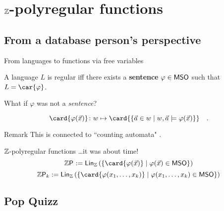 \documentclass{beamer}
\begin{document}
\section{$\mathbb{Z}$-polyregular functions}
\subsection{From a database person’s perspective}

\begin{frame}{From languages to functions via free variables}
    \begin{theorem}
        A language $L$ is regular
        iff there exists a \textbf{sentence}
        $\varphi \in \mathsf{MSO}$
        such that $L = \car{\varphi}$.
    \end{theorem}
    \pause
    \begin{center}
        What if $\varphi$ was not a \emph{sentence}?
    \end{center}
    \begin{definition}
        \begin{equation*}
            \card{\varphi(\vec{x})}
            \colon 
            w \mapsto
            \card{\setof{\vec{a} \in w}{w, \vec{a} \models \varphi(\vec{x})}}
            \quad .
        \end{equation*}
    \end{definition}
    \pause
    \begin{exampleblock}{Remark}
        This is connected to ``counting automata" \cite{schutzenberger1962}.
    \end{exampleblock}
\end{frame}

\begin{frame}{$\mathbb{Z}$-polyregular functions \hfill \ldots it was about time!}
    \begin{equation*}
        \Zpoly \defined
        \Span{\setof{\card{\varphi(\vec{x})}}{\varphi(\vec{x}) \in \MSO}}
    \end{equation*}
    \pause
    \begin{equation*}
        \Zpoly[k] \defined
        \Span{\setof{\card{\varphi(x_1, \dots, x_k)}}{\varphi(x_1, \dots, x_k) \in \MSO}}
    \end{equation*}
\end{frame}

\subsection{Pop Quizz}
\end{document}
